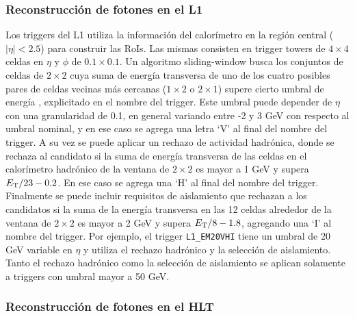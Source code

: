 \subsubsection{Reconstrucción de fotones en el L1}

Los triggers del L1 \commentNotaII utiliza la información del calorímetro en la región central ($|\eta|<2.5$) para construir las RoIs. Las mismas consisten en trigger towers  de $4\times4$ celdas en $\eta$ y $\phi$ de $0.1\times0.1$. Un algoritmo sliding-window  busca los conjuntos de celdas de $2\times2$ cuya suma de energía transversa de uno de los cuatro posibles pares de celdas vecinas más cercanas ($1\times2$ o $2\times1$) supere cierto umbral de energía , explicitado en el nombre del trigger. Este umbral puede depender de $\eta$ con una granularidad de 0.1, en general variando entre -2 y 3 GeV con respecto al umbral nominal, y en ese caso se agrega una letra `V' al final del nombre del trigger. A su vez se puede aplicar un rechazo de actividad hadrónica, donde se rechaza al candidato si la suma de energía transversa de las celdas en el calorímetro hadrónico de la ventana de $2\times2$ es mayor a 1 GeV y supera $E_{\text{T}}/23-0.2$. En ese caso se agrega una `H' al final del nombre del trigger. Finalmente se puede incluir requisitos de aislamiento que rechazan a los candidatos si la suma de la energía transversa en las 12 celdas alrededor de la ventana de $2\times2$ es mayor a 2 GeV y supera $E_{\text{T}}/8-1.8$, agregando una `I' al nombre del trigger. Por ejemplo, el trigger \texttt{L1\_EM20VHI} tiene un umbral de 20 GeV variable en $\eta$ y utiliza el rechazo hadrónico y la selección de aislamiento. Tanto el rechazo hadrónico como la selección de aislamiento se aplican solamente a triggers con umbral mayor a 50 GeV.

\subsubsection{Reconstrucción de fotones en el HLT}

